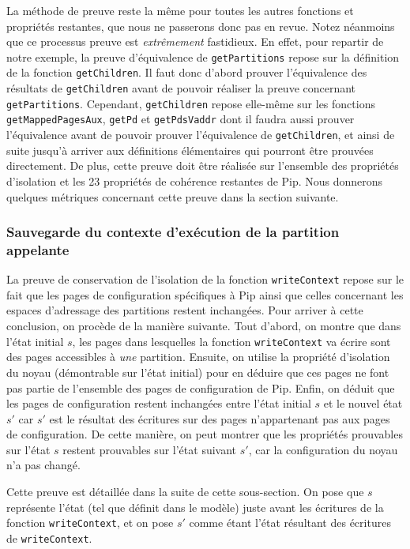 			La méthode de preuve reste la même pour toutes les autres fonctions et propriétés restantes, que nous ne passerons donc pas en revue. Notez néanmoins que ce processus preuve est \emph{extrêmement} fastidieux. En effet, pour repartir de notre exemple, la preuve d'équivalence de \texttt{getPartitions} repose sur la définition de la fonction \texttt{getChildren}. Il faut donc d'abord prouver l'équivalence des résultats de \texttt{getChildren} avant de pouvoir réaliser la preuve concernant \texttt{getPartitions}. Cependant, \texttt{getChildren} repose elle-même sur les fonctions \texttt{getMappedPagesAux}, \texttt{getPd} et \texttt{getPdsVaddr} dont il faudra aussi prouver l'équivalence avant de pouvoir prouver l'équivalence de \texttt{getChildren}, et ainsi de suite jusqu'à arriver aux définitions élémentaires qui pourront être prouvées directement. De plus, cette preuve doit être réalisée sur l'ensemble des propriétés d'isolation et les 23 propriétés de cohérence restantes de Pip. Nous donnerons quelques métriques concernant cette preuve dans la section suivante.

			\subsubsection{Sauvegarde du contexte d'exécution de la partition appelante}

			La preuve de conservation de l'isolation de la fonction \texttt{writeContext} repose sur le fait que les pages de configuration spécifiques à Pip ainsi que celles concernant les espaces d'adressage des partitions restent inchangées. Pour arriver à cette conclusion, on procède de la manière suivante. Tout d'abord, on montre que dans l'état initial $s$, les pages dans lesquelles la fonction \texttt{writeContext} va écrire sont des pages accessibles à \emph{une} partition. Ensuite, on utilise la propriété d'isolation du noyau (démontrable sur l'état initial) pour en déduire que ces pages ne font pas partie de l'ensemble des pages de configuration de Pip. Enfin, on déduit que les pages de configuration restent inchangées entre l'état initial $s$ et le nouvel état $s'$ car $s'$ est le résultat des écritures sur des pages n'appartenant pas aux pages de configuration. De cette manière, on peut montrer que les propriétés prouvables sur l'état $s$ restent prouvables sur l'état suivant $s'$, car la configuration du noyau n'a pas changé.

			Cette preuve est détaillée dans la suite de cette sous-section. On pose que $s$ représente l'état (tel que définit dans le modèle) juste avant les écritures de la fonction \texttt{writeContext}, et on pose $s'$ comme étant l'état résultant des écritures de \texttt{writeContext}.

